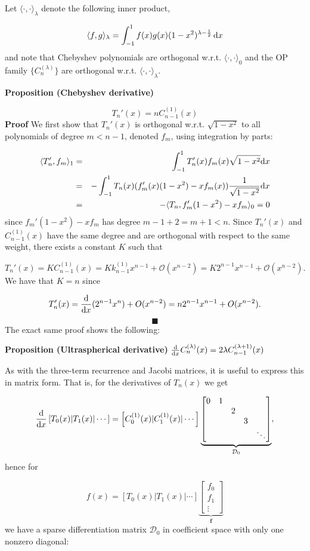 \documentclass[12pt,a4paper]{article}
\begin{document}
Let $\langle \cdot, \cdot \rangle_{\lambda}$ denote the following inner product,

\[
\langle f, g \rangle_{\lambda} = \int_{-1}^{1} f(x) g(x) (1-x^2)^{\lambda - \frac{1}{2}}\,{\rm d}x
\]
and note that Chebyshev polynomials are orthogonal w.r.t. $\langle \cdot, \cdot \rangle_{0}$ and the OP family $\{ C_n^{(\lambda)}\}$ are orthogonal w.r.t. $\langle \cdot, \cdot \rangle_{\lambda}$.

\textbf{Proposition (Chebyshev derivative)}

\[
T_n'(x) = n C^{(1)}_{n-1}(x)
\]
\textbf{Proof} We first show that $T_n'(x)$ is orthogonal w.r.t. $\sqrt{1-x^2}$ to all  polynomials of degree $m < n-1$, denoted $f_m$, using integration by parts:


\begin{eqnarray*}
\langle T_n',f_m\rangle_{1} &=& \int_{-1}^1 T_n'(x) f_m(x) \sqrt{1-x^2} {\rm d}x \\
&=& -\int_{-1}^1 T_n(x) (f_m'(x)(1-x^2) - xf_m(x)) {1  \over \sqrt{1-x^2}} {\rm d}x  \\ 
&=& - \langle T_n, f_m'(1-x^2) - x f_m \rangle_{0}  = 0
\end{eqnarray*}
since $f_m'(1-x^2) - x f_m $ has degree $m-1 +2 = m+1 < n$.  Since $T_n'(x)$ and $C^{(1)}_{n-1}(x)$ have the same degree and are orthogonal with respect to the same weight, there exists a constant $K$ such that 

\[
T_n'(x) = KC^{(1)}_{n-1}(x) = K k_{n-1}^{(1)}x^{n-1} + \mathcal{O}(x^{n-2})= K 2^{n-1}x^{n-1} + \mathcal{O}(x^{n-2}).
\]
We have that $K = n$ since

\[
T_n'(x) = {{\rm d} \over {\rm d}x} (2^{n-1} x^n)  + O(x^{n-2}) = n 2^{n-1} x^{n-1} + O(x^{n-2}).
\]
\[
\blacksquare
\]
The exact same proof shows the following:

\textbf{Proposition (Ultraspherical derivative)} ${{\rm d} \over {\rm d}x} C_n^{(\lambda)}(x) = 2 \lambda  C_{n-1}^{(\lambda+1)}(x)$

As with the three-term recurrence and Jacobi matrices, it is useful to express this in matrix form. That is, for the derivatives of $T_n(x)$ we get

\[
{{\rm d} \over {\rm d}x}\left[T_0(x) | T_1(x) | \cdots \right] = \left[C_0^{(1)}(x) | C_1^{(1)}(x) | \cdots \right]\underbrace{\begin{bmatrix}
0 & 1 \cr
&& 2 \cr
&&& 3 \cr
&&&&\ddots
\end{bmatrix}}_{\mathcal{D}_0},
\]
hence for 

\[
f(x) = \left[T_0(x) | T_1(x) | \cdots \right] \underbrace{\begin{bmatrix} f_0\\f_1\\\vdots \end{bmatrix}}_{\mathbf{f}}
\]
we have a sparse differentiation matrix $\mathcal{D}_0$ in coefficient space with only one nonzero diagonal: 
\end{document}
